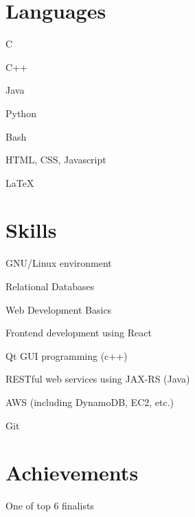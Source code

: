 \documentclass[]{deedy-resume-openfont}
\begin{document}
\begin{minipage}[t]{0.4\textwidth} 

\section{Languages} 
\hspace{0.5em}
\begin{tightemize}
\item C
\item C++
\item Java
\end{tightemize}
\sectionsep
{}
\begin{tightemize}
\item Python
\item Bash
\item HTML, CSS, Javascript
\item \LaTeX
\end{tightemize}
\sectionsep

\section{Skills} 
\sectionsep
\begin{tightemize}
\item GNU/Linux environment
\item Relational Databases
\item Web Development Basics
\item Frontend development using React
\item Qt GUI programming (c++)
\item RESTful web services using JAX-RS (Java)
\item AWS (including DynamoDB, EC2, etc.)
\item Git
\end{tightemize}
\sectionsep



\section{Achievements}
\sectionsep
\begin{tightemize}

\item {}
One of top 6 finalists

\item {}


\end{tightemize}
\end{minipage}
\end{document}
